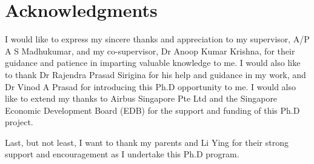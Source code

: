 \chapter* {Acknowledgments}

I would like to express my sincere thanks and appreciation to my supervisor, A/P A S Madhukumar, and my co-supervisor, Dr Anoop Kumar Krishna, for their guidance and patience in imparting valuable knowledge to me. I would also like to thank Dr Rajendra Prasad Sirigina for his help and guidance in my work, and Dr Vinod A Prasad for introducing this Ph.D opportunity to me. I would also like to extend my thanks to Airbus Singapore Pte Ltd and the Singapore Economic Development Board (EDB) for the support and funding of this Ph.D project. 

Last, but not least, I want to thank my parents and Li Ying for their strong support and encouragement as I undertake this Ph.D program.
